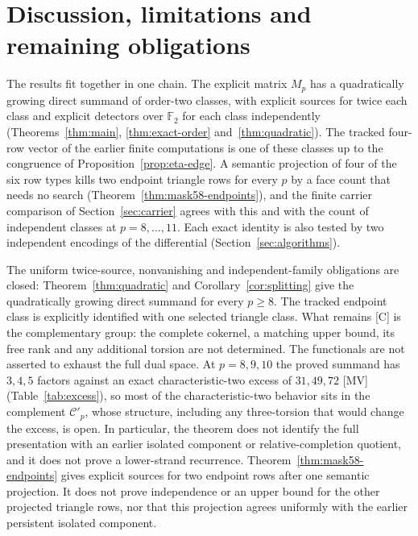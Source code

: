 \documentclass[11pt]{article}
\theoremstyle{definition}
\theoremstyle{remark}
\begin{document}
\section{Discussion, limitations and remaining obligations}\label{sec:discussion}

The results fit together in one chain. The explicit matrix $M_p$ has a quadratically
growing direct summand of order-two classes, with explicit sources for twice each class and
explicit detectors over $\mathbb F_2$ for each class independently
(Theorems~\ref{thm:main}, \ref{thm:exact-order} and~\ref{thm:quadratic}). The tracked
four-row vector of the earlier finite computations is one of these classes up to the
congruence of Proposition~\ref{prop:eta-edge}. A semantic projection of four of the six row
types kills two endpoint triangle rows for every $p$ by a face count that needs no search
(Theorem~\ref{thm:mask58-endpoints}), and the finite carrier comparison of
Section~\ref{sec:carrier} agrees with this and with the count of independent classes at
$p=8,\ldots,11$. Each exact identity is also tested by two independent encodings of the
differential (Section~\ref{sec:algorithms}).

The uniform twice-source, nonvanishing and independent-family obligations
are closed: Theorem~\ref{thm:quadratic} and Corollary~\ref{cor:splitting}
give the quadratically growing direct summand for every $p\geq8$.
The tracked endpoint class is explicitly identified with one selected
triangle class. What remains [C] is the complementary group: the complete
cokernel, a matching upper bound, its free rank and any additional torsion
are not determined. The functionals are not asserted to exhaust the full
dual space. At $p=8,9,10$ the proved summand has $3,4,5$ factors against an
exact characteristic-two excess of $31,49,72$ [MV] (Table~\ref{tab:excess}), so most of the
characteristic-two behavior sits in the complement $\mathcal C'_p$, whose
structure, including any three-torsion that would change the excess, is open.
In particular, the theorem does not identify the full
presentation with an earlier isolated component or relative-completion
quotient, and it does not prove a lower-strand recurrence.
Theorem~\ref{thm:mask58-endpoints} gives explicit sources for two endpoint
rows after one semantic projection. It does not prove independence or an upper
bound for the other projected triangle rows, nor that this projection agrees
uniformly with the earlier persistent isolated component.
\end{document}
